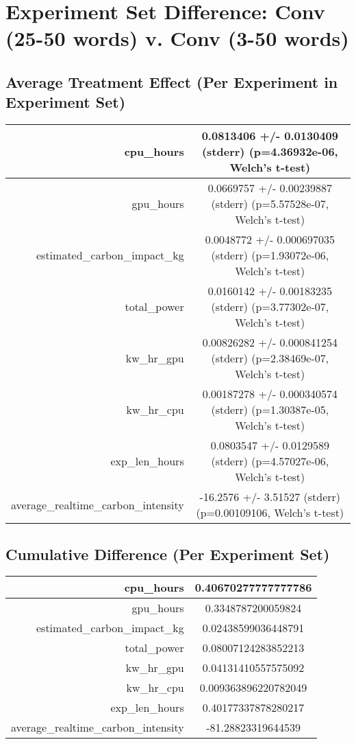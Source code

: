 \documentclass{article}%
\begin{document}
%
\normalsize%
\section{Experiment Set Difference: Conv (25{-}50 words) v. Conv (3{-}50 words)}%
\label{sec:Experiment Set Difference Conv (25{-}50 words) v. Conv (3{-}50 words)}%
\subsection{Average Treatment Effect (Per Experiment in Experiment Set)}%
\label{subsec:Average Treatment Effect (Per Experiment in Experiment Set)}%
\begin{tabular}{|r|c|}%
\hline%
cpu\_hours&0.0813406 +/{-} 0.0130409 (stderr) (p=4.36932e{-}06, Welch's t{-}test)\\%
\hline%
gpu\_hours&0.0669757 +/{-} 0.00239887 (stderr) (p=5.57528e{-}07, Welch's t{-}test)\\%
\hline%
estimated\_carbon\_impact\_kg&0.0048772 +/{-} 0.000697035 (stderr) (p=1.93072e{-}06, Welch's t{-}test)\\%
\hline%
total\_power&0.0160142 +/{-} 0.00183235 (stderr) (p=3.77302e{-}07, Welch's t{-}test)\\%
\hline%
kw\_hr\_gpu&0.00826282 +/{-} 0.000841254 (stderr) (p=2.38469e{-}07, Welch's t{-}test)\\%
\hline%
kw\_hr\_cpu&0.00187278 +/{-} 0.000340574 (stderr) (p=1.30387e{-}05, Welch's t{-}test)\\%
\hline%
exp\_len\_hours&0.0803547 +/{-} 0.0129589 (stderr) (p=4.57027e{-}06, Welch's t{-}test)\\%
\hline%
average\_realtime\_carbon\_intensity&{-}16.2576 +/{-} 3.51527 (stderr) (p=0.00109106, Welch's t{-}test)\\%
\hline%
\end{tabular}

%
\subsection{Cumulative Difference (Per Experiment Set)}%
\label{subsec:Cumulative Difference (Per Experiment Set)}%
\begin{tabular}{|r|c|}%
\hline%
cpu\_hours&0.40670277777777786\\%
\hline%
gpu\_hours&0.3348787200059824\\%
\hline%
estimated\_carbon\_impact\_kg&0.02438599036448791\\%
\hline%
total\_power&0.08007124283852213\\%
\hline%
kw\_hr\_gpu&0.04131410557575092\\%
\hline%
kw\_hr\_cpu&0.009363896220782049\\%
\hline%
exp\_len\_hours&0.40177337878280217\\%
\hline%
average\_realtime\_carbon\_intensity&{-}81.28823319644539\\%
\hline%
\end{tabular}

%
\end{document}

